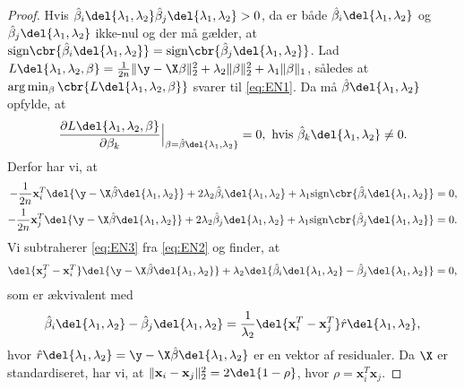\begin{proof}
Hvis \(\hat{\beta}_i \del{\lambda_1, \lambda_2} \hat{\beta}_j \del{\lambda_1, \lambda_2} > 0\), da er både \(\hat{\beta}_i \del{\lambda_1, \lambda_2}\) og \(\hat{\beta}_j \del{\lambda_1, \lambda_2}\) ikke-nul og der må gælder, at \(\text{sign} \cbr{\hat{\beta}_i \del{\lambda_1, \lambda_2}} = \text{sign} \cbr{\hat{\beta}_j \del{\lambda_1, \lambda_2}}\).
Lad \(L \del{\lambda_1,\lambda_2, \beta} = \frac{1}{2n} \Vert \y - \X \beta \Vert_2^2 + \lambda_2 \Vert \beta \Vert_2^2 + \lambda_1 \Vert \beta \Vert_1\), således at  \(\arg \min_{\beta} \cbr{L \del{\lambda_1,\lambda_2, \beta}}\) svarer til \eqref{eq:EN1}.
Da må \(\hat{\beta} \del{\lambda_1, \lambda_2}\) opfylde, at
\begin{align*}
\frac{\partial L \del{\lambda_1,\lambda_2, \beta} }{\partial \beta_k} \Bigr|_{\beta = \hat{\beta} \del{\lambda_1, \lambda_2}}=0, \text{ hvis } \hat{\beta}_k \del{\lambda_1, \lambda_2} \neq 0.
\end{align*}
Derfor har vi, at
\begin{align}
-\frac{1}{2n} \mathbf{x}_i^T \del{\y - \X \hat{\beta} \del{\lambda_1, \lambda_2}} +  2 \lambda_2 \hat{\beta}_i \del{\lambda_1, \lambda_2} + \lambda_1 \text{sign} \cbr{\hat{\beta}_i \del{\lambda_1, \lambda_2}} &= 0, \label{eq:EN2}\\
-\frac{1}{2n} \mathbf{x}_j^T \del{\y - \X \hat{\beta} \del{\lambda_1, \lambda_2}} + 2 \lambda_2 \hat{\beta}_j \del{\lambda_1, \lambda_2} + \lambda_1 \text{sign} \cbr{\hat{\beta}_j \del{\lambda_1, \lambda_2}} &= 0. \label{eq:EN3}
\end{align}
Vi subtraherer \eqref{eq:EN3} fra \eqref{eq:EN2} og finder, at
\begin{align*}
\del{\mathbf{x}_j^T-\mathbf{x}_i^T} \del{\y - \X \hat{\beta} \del{\lambda_1, \lambda_2}} + \lambda_2 \del{\hat{\beta}_i \del{\lambda_1, \lambda_2} - \hat{\beta}_j \del{\lambda_1, \lambda_2}} =0,
\end{align*}
som er ækvivalent med
\begin{align}
\hat{\beta}_i \del{\lambda_1, \lambda_2} - \hat{\beta}_j \del{\lambda_1, \lambda_2} = \frac{1}{\lambda_2} \del{\mathbf{x}_i^T-\mathbf{x}_j^T} \hat{r}\del{\lambda_1, \lambda_2}, \label{eq:EN4}
\end{align}
hvor \(\hat{r}\del{\lambda_1, \lambda_2} = \y - \X  \hat{\beta} \del{\lambda_1, \lambda_2}\) er en vektor af residualer.
Da \(\X\) er standardiseret, har vi, at \(\Vert \mathbf{x}_i - \mathbf{x}_j \Vert_2^2=2 \del{1-\rho}\), hvor \(\rho = \mathbf{x}_i^T \mathbf{x}_j\).

\end{proof}
